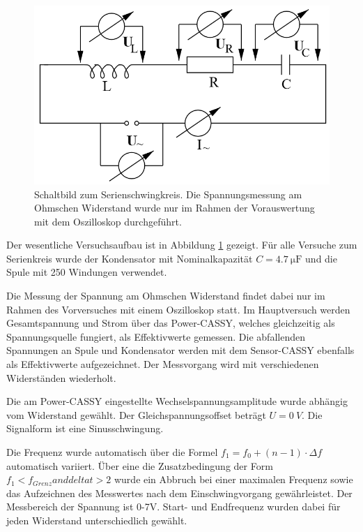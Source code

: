 \documentclass[12pt,a4paper]{article}
\begin{document}
\begin{figure}
\centering
\includegraphics[scale=0.8]{Bilder/AufbauSerie.png}
\caption{Schaltbild zum Serienschwingkreis. Die Spannungsmessung am Ohmschen Widerstand wurde nur im Rahmen der Vorauswertung mit dem Oszilloskop durchgeführt.}
\label{fig:AufbauSerie}
\end{figure}

Der wesentliche Versuchsaufbau ist in Abbildung \ref{fig:AufbauSerie} gezeigt. Für alle Versuche zum Serienkreis wurde der Kondensator mit Nominalkapazität $C=\SI{4,7}{\micro \F}$ und die Spule mit 250 Windungen verwendet.

Die Messung der Spannung am Ohmschen Widerstand findet dabei nur im Rahmen des Vorversuches mit einem Oszilloskop statt.
Im Hauptversuch werden Gesamtspannung und Strom über das Power-CASSY, welches gleichzeitig als Spannungsquelle fungiert, als Effektivwerte gemessen. Die abfallenden Spannungen an Spule und Kondensator werden mit dem Sensor-CASSY ebenfalls als Effektivwerte aufgezeichnet. Der Messvorgang wird mit verschiedenen Widerständen wiederholt.

Die am Power-CASSY eingestellte Wechselspannungsamplitude wurde abhängig vom Widerstand gewählt. Der Gleichspannungsoffset beträgt $U = \SI{0}{V}$. Die Signalform ist eine Sinusschwingung.

Die Frequenz wurde automatisch über die Formel $f_1 = f_0 +(n-1) \cdot \Delta f$ automatisch variiert. Über eine die Zusatzbedingung der Form$f_1 < f_{Grenz} and delta t > 2$ wurde ein Abbruch bei einer maximalen Frequenz sowie das Aufzeichnen des Messwertes nach dem Einschwingvorgang gewährleistet. Der Messbereich der Spannung ist 0-7V. Start- und Endfrequenz wurden dabei für jeden Widerstand unterschiedlich gewählt.
\end{document}

